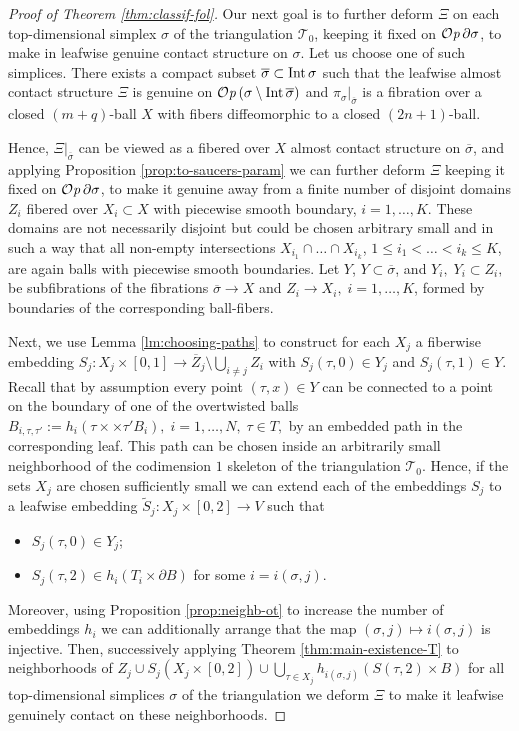 \documentclass[12pt]{paper}
\theoremstyle{plain}
\theoremstyle{definition}
\newcommand{\wt}{\widetilde}
\newcommand{\p}{\partial}
\newcommand{\Int}{{\rm Int\,}} %
\newcommand{\TT}{\mathcal{T}}
\def\Op{{\mathcal O}{\it p}\,}
\numberwithin{figure}{section}
\begin{document}
\begin{proof}[Proof of Theorem  \ref{thm:classif-fol}]
 Our next goal is to  further deform $\Xi$ on each top-dimensional  simplex $\sigma$ of the triangulation $\TT_0$, keeping it fixed on $\Op\p\sigma$,   to make in leafwise genuine contact structure on $\sigma$.    Let us choose one of such simplices.
  There exists  a compact subset $\overline\sigma\subset\Int\sigma$ such that the leafwise almost contact structure $\Xi$ is genuine on
   $\Op(\sigma\setminus\Int\overline\sigma)$ and 
   $\pi_\sigma|_{\overline\sigma}$ is a fibration over a closed  $(m+q)$-ball $X $ with fibers diffeomorphic to a closed $(2n+1)$-ball.
  
    
 Hence, $\Xi|_{\overline\sigma}$ can be viewed as a fibered  over $X$ almost contact structure on $\overline\sigma$, and applying Proposition \ref{prop:to-saucers-param}  we can further deform $\Xi$  keeping it fixed on  $\Op\p\sigma$,    to make it   genuine away from a finite number of  disjoint domains $Z_i$  fibered over    $X_i\subset X$ with piecewise smooth boundary, $i=1,\dots, K$. These domains are not necessarily disjoint but could be
chosen    arbitrary small and in such a way that all non-empty intersections $X_{i_1}\cap\dots\cap X_{i_k}$, $1\leq i_1<\dots<i_k\leq K$, are again balls with piecewise smooth boundaries. Let $Y$,  $Y\subset\overline\sigma$, and $Y_i,\; Y_i\subset Z_i,$ be subfibrations of the fibrations $\overline\sigma\to X$ and $Z_i\to X_i , \; i=1,\dots, K$, formed by boundaries of the corresponding ball-fibers.

Next, we use Lemma \ref{lm:choosing-paths}  to construct for each $X_j$ a fiberwise embedding 
$S_j:X_j\times[0,1]\to\overline  Z_j\setminus \bigcup\limits_{i\neq j}Z_i$ with $S_j(\tau,0)\in   Y_j$ and 
 $S_j(\tau,1)\in   Y$. 
 Recall that  by assumption  every point  $(\tau,x)\in   Y$ 
 can be connected to  a  point on the boundary of one of the 
 overtwisted balls 
 $B_{i,\tau,\tau'}:=h_i(\tau\times\times\tau' B_i), \; i=1,\dots, N,\;\tau\in T,$ by an embedded path  in the corresponding leaf.
  This path  can be chosen  inside an arbitrarily small  neighborhood  of the  codimension $1$ skeleton of the triangulation $\TT_0$.
   Hence,  if the sets $X_j$ are chosen sufficiently small  we can extend each of the  embeddings $S_j$ to a leafwise   embedding $\wt S_j:X_j\times[0,2]\to V$  
    such that 
 \begin{itemize}
 \item  $S_j(\tau,0)\in   Y_j$;
 \item   $S_j(\tau,2)\in h_i(T_i\times\p B) $ for some $i=i(\sigma,j)$.
 \end{itemize}
Moreover,   using  Proposition \ref{prop:neighb-ot} to increase the number of embeddings $h_i$ we can additionally arrange that
 the map $(\sigma,j)\mapsto i(\sigma,j)$  is injective.
    Then,  successively applying  Theorem \ref{thm:main-existence-T} to neighborhoods of
  $Z_j\cup S_j(X_j\times[0,2])\cup \bigcup\limits_{\tau\in X_j}h_{i(\sigma,j)}(S(\tau,2)\times B)$  for all top-dimensional simplices $\sigma$ of the triangulation we deform $\Xi$ to make it leafwise genuinely contact on these neighborhoods.
   \end{proof}
\end{document}
